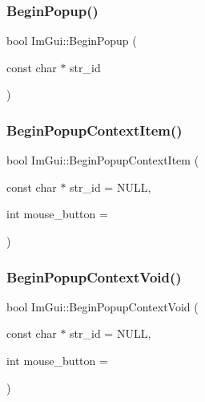 \hypertarget{namespace_im_gui_ab71527de4b52ff970e5396040302e134}{}\label{namespace_im_gui_ab71527de4b52ff970e5396040302e134} 
\subsubsection{\texorpdfstring{Begin\+Popup()}{BeginPopup()}}
{\footnotesize\ttfamily bool Im\+Gui\+::\+Begin\+Popup (\begin{DoxyParamCaption}\item[{const char $\ast$}]{str\+\_\+id }\end{DoxyParamCaption})}

\hypertarget{namespace_im_gui_a579fc507f5b5d164c8fd628aee3d7bbd}{}\label{namespace_im_gui_a579fc507f5b5d164c8fd628aee3d7bbd} 
\subsubsection{\texorpdfstring{Begin\+Popup\+Context\+Item()}{BeginPopupContextItem()}}
{\footnotesize\ttfamily bool Im\+Gui\+::\+Begin\+Popup\+Context\+Item (\begin{DoxyParamCaption}\item[{const char $\ast$}]{str\+\_\+id = {\ttfamily NULL},  }\item[{int}]{mouse\+\_\+button = {} }\end{DoxyParamCaption})}

\hypertarget{namespace_im_gui_a87a2228929503fff067d2e167a690751}{}\label{namespace_im_gui_a87a2228929503fff067d2e167a690751} 
\subsubsection{\texorpdfstring{Begin\+Popup\+Context\+Void()}{BeginPopupContextVoid()}}
{\footnotesize\ttfamily bool Im\+Gui\+::\+Begin\+Popup\+Context\+Void (\begin{DoxyParamCaption}\item[{const char $\ast$}]{str\+\_\+id = {\ttfamily NULL},  }\item[{int}]{mouse\+\_\+button = {} }\end{DoxyParamCaption})}

